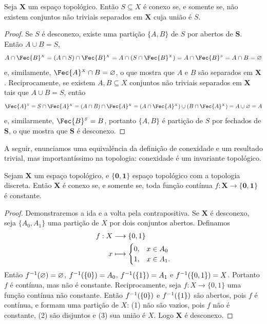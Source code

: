 \begin{prop}
Seja $\bm X$ um espaço topológico. Então $S \subseteq X$ é conexo se, e somente se, não existem conjuntos não triviais separados em $\bm X$ cuja união é $S$.
\end{prop}
\begin{proof}
Se $S$ é desconexo, existe uma partição $\{A,B\}$ de $S$ por abertos de $\bm S$. Então $A \cup B=S$,
	\begin{equation*}
	A \cap \Fec{B}^{_X} = (A \cap S) \cap \Fec{B}^{_X} = A \cap (S \cap \Fec{B}^{_X}) = A \cap \Fec{B}^{_S} = A \cap B = \emptyset
	\end{equation*}
e, similamente, $\Fec{A}^{_X} \cap B = \emptyset$, o que mostra que $A$ e $B$ são separados em $\bm X$. Reciprocamente, se existem $A,B \subseteq X$ conjuntos não triviais separados em $\bm X$ tais que $A \cup B=S$, então
	\begin{equation*}
	\Fec{A}^{_S} = S \cap \Fec{A}^{_X} = (A \cap B) \cap \Fec{A}^{_X} = (A \cap \Fec{A}^{_X}) \cup (B \cap \Fec{A}^{_X}) = A \cup \emptyset = A
	\end{equation*}
e, similarmente, $\Fec{B}^{_S}=B$, portanto $\{A,B\}$ é partição de $S$ por fechados de $\bm S$, o que mostra que $\bm S$ é desconexo.
\end{proof}

A seguir, enunciamos uma equivalência da definição de conexidade e um resultado trivial, mas importantíssimo na topologia: conexidade é um invariante topológico.

\begin{prop}
Sejam $\bm X$ um espaço topológico, e $\bm {\{0,1\}}$ espaço topológico com a topologia discreta. Então $\bm X$ é conexo se, e somente se, toda função contínua $f: \bm X \to \bm{\{0,1\}}$ é constante.
\end{prop}
\begin{proof}
Demonstraremos a ida e a volta pela contrapositiva. Se $\bm X$ é desconexo, seja $\{A_0,A_1\}$ uma partição de $X$ por dois conjuntos abertos. Definamos
	\begin{align*}
	{f}: {X} &\longrightarrow {\{0,1\}} \\{x} &\longmapsto {
	\begin{cases}
		0,& x \in A_0 \\
		1,& x \in A_1.
	\end{cases}}
	\end{align*}
Então $f^{-1}(\varnothing)=\varnothing$, $f^{-1}(\{0\}) = A_0$, $f^{-1}(\{1\})=A_1$ e $f^{-1}(\{0,1\})=X$. Portanto $f$ é contínua, mas não é constante. Reciprocamente, seja $f: X \to \{0,1\}$ uma função contínua não constante. Então $f^{-1}(\{0\})$ e $f^{-1}(\{1\})$ são abertos, pois $f$ é contínua, e formam uma partição de $X$: (1) não são vazios, pois $f$ não é constante, (2) são disjuntos e (3) sua união é $X$. Logo $\bm X$ é desconexo.
\end{proof}

